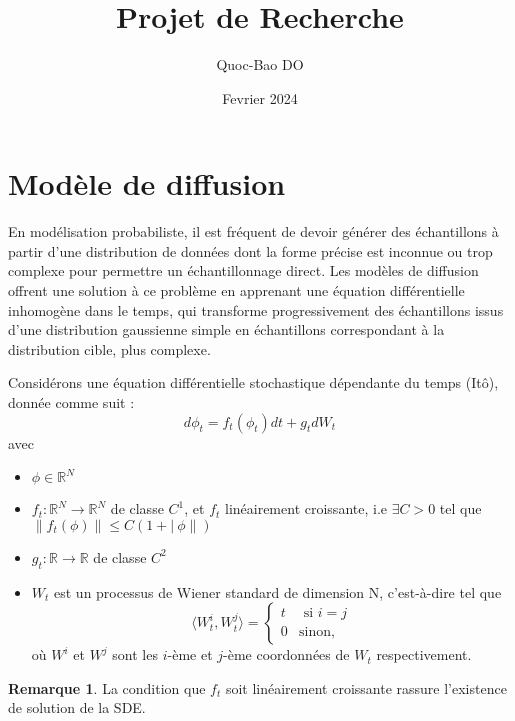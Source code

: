 \documentclass[a4paper,10pt]{article}
\title{Projet de Recherche}
\author{Quoc-Bao DO}
\date{Fevrier 2024}
\theoremstyle{definition} %
\theoremstyle{definition} %
\theoremstyle{definition} %
\theoremstyle{definition} %
\newtheorem{remark}[definition]{Remarque}
\newcommand{\R}{\mathbb{R}}
\begin{document}
\maketitle

\section{Modèle de diffusion}

    En modélisation probabiliste, il est fréquent de devoir générer des échantillons à partir d'une distribution de données dont la forme précise est inconnue ou trop complexe pour permettre un échantillonnage direct. Les modèles de diffusion offrent une solution à ce problème en apprenant une équation différentielle inhomogène dans le temps, qui transforme progressivement des échantillons issus d'une distribution gaussienne simple en échantillons correspondant à la distribution cible, plus complexe.

Considérons une équation différentielle stochastique dépendante du temps (Itô), donnée comme suit :
    \begin{equation}\label{eq:SDE}
         d\phi_t = f_t(\phi_t)dt + g_tdW_t
    \end{equation}
    avec 
    \begin{itemize}
        \item $\phi \in \R^N$
        \item $f_t:\R^N \rightarrow \R^N$ de classe $C^1$, et $f_t$ linéairement croissante, i.e $\exists C > 0$ tel que $\|f_t(\phi)\| \leq C(1+|\ \phi \|)$
        \item $g_t : \R \rightarrow \R$ de classe $C^2$
        \item $W_t$ est un processus de Wiener standard de dimension N, c'est-à-dire tel que 
            \begin{equation}
                \langle W_t^i, W_t^j \rangle =
                    \begin{cases}    
                        t & \textrm{ si } i=j \\
                        0 & \textrm{sinon},
                    \end{cases}
            \end{equation}
            où $W^i$ et $W^j$ sont les $i$-ème et $j$-ème coordonnées de $W_t$ respectivement. 
    \end{itemize}
    \begin{remark}
        La condition que $f_t$ soit linéairement croissante rassure l'existence de solution de la SDE.
    \end{remark}
\end{document}
